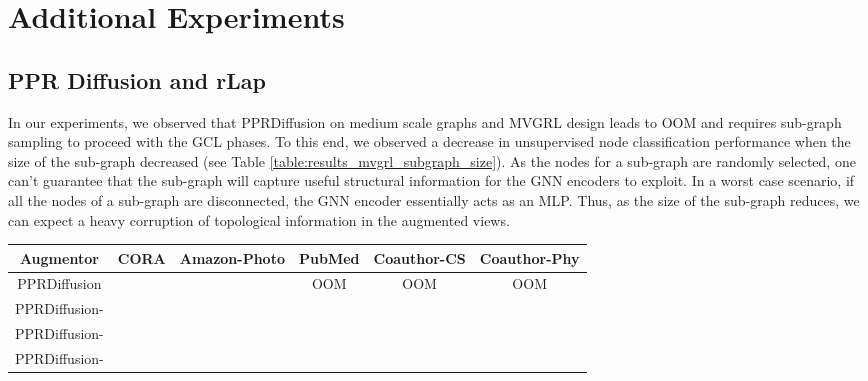 \documentclass{article}
\theoremstyle{plain}
\theoremstyle{definition}
\theoremstyle{remark}
\begin{document}
\section{Additional Experiments}
\label{app:add_exp}

\subsection{PPR Diffusion and rLap}

In our experiments, we observed that PPRDiffusion on medium scale graphs and MVGRL design leads to OOM and requires sub-graph sampling to proceed with the GCL phases. To this end, we observed a decrease in unsupervised node classification performance when the size of the sub-graph decreased (see Table \ref{table:results_mvgrl_subgraph_size}). As the nodes for a sub-graph are randomly selected, one can't guarantee that the sub-graph will capture useful structural information for the GNN encoders to exploit. In a worst case scenario, if all the nodes of a sub-graph are disconnected, the GNN encoder essentially acts as an MLP. Thus, as the size of the sub-graph reduces, we can expect a heavy corruption of topological information in the augmented views.

\begin{table*}[ht!]
\centering
\caption{Evaluation (in accuracy) on benchmark node datasets with \textbf{MVGRL} based design and PPR Diffusion with varying sub-graph sizes. PPRDiffusion indicates the full graph view and PPRDiffusion- indicates a sampled sub-graph with  nodes as the graph view. }
\label{table:results_mvgrl_subgraph_size}
\vskip 0.15in
\begin{center}
\begin{small}
\begin{sc}
\begin{tabular}{c|c|c|c|c|c}
\toprule
Augmentor & CORA & Amazon-Photo & PubMed & Coauthor-CS & Coauthor-Phy \\
\midrule
PPRDiffusion &   &   & OOM & OOM & OOM \\
PPRDiffusion- &   &   &  &  &  \\
PPRDiffusion- &  &  &  &  &  \\
PPRDiffusion- &  &  &  &  &  \\
\bottomrule
\end{tabular}
\end{sc}
\end{small}
\end{center}
\vskip -0.1in
\end{table*}
\end{document}
